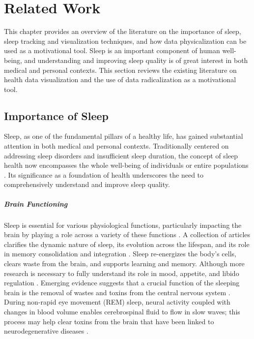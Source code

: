 \documentclass[
  a4paper,  %
  twoside,  %
  bibliography=totoc,
  headsepline,
  cleardoublepage=empty,
  parskip=half,
  draft=false
]{scrbook}
\begin{document}

\chapter{Related Work}

This chapter provides an overview of the literature on the importance of sleep, sleep tracking and visualization techniques, and how data physicalization can be used as a motivational tool.
Sleep is an important component of human well-being, and understanding and improving sleep quality is of great interest in both medical and personal contexts. This section reviews the existing literature on health data visualization and the use of data radicalization as a motivational tool.

\section{Importance of Sleep}

Sleep, as one of the fundamental pillars of a healthy life, has gained substantial attention in both medical and personal contexts. Traditionally centered on addressing sleep disorders and insufficient sleep duration, the concept of sleep health now encompasses the whole well-being of individuals or entire populations \cite{Define_Sleep_Health}. Its significance as a foundation of health underscores the need to comprehensively understand and improve sleep quality.

\paragraph{Brain Functioning}
Sleep is essential for various physiological functions, particularly impacting the brain by playing a role across a variety of these functions \cite{tai_impact_2022}. A collection of articles clarifies the dynamic nature of sleep, its evolution across the lifespan, and its role in memory consolidation and integration \cite{simon_functions_2022}. Sleep re-energizes the body’s cells, clears waste from the brain, and supports learning and memory. Although more research is necessary to fully understand its role in mood, appetite, and libido regulation \cite{cirelli_sleeping_2017}. Emerging evidence suggests that a crucial function of the sleeping brain is the removal of wastes and toxins from the central nervous system \cite{semyachkina-glushkovskaya_brain_2023}. During non-rapid eye movement (REM) sleep, neural activity coupled with changes in blood volume enables cerebrospinal fluid to flow in slow waves; this process may help clear toxins from the brain that have been linked to neurodegenerative diseases \cite{lehmann_slow_2019}.
\end{document}
